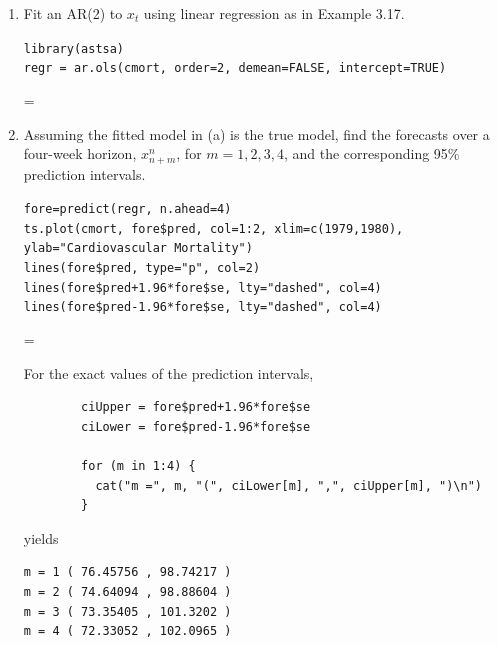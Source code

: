 \documentclass[12pt]{article}
\makeatletter
\newcommand*\notab[1]{%
  \begingroup   %
    \par        %
    \@totalleftmargin=0pt \linewidth=\columnwidth
    \parshape 0
    #1\par      %
  \endgroup
}
\newcommand{\nl}{\vspace{0.1in}\noindent}
\makeatother
\begin{document}
\begin{enumerate}[label=(\alph*)]
    \item Fit an AR(2) to $x_t$ using linear regression as in Example 3.17.
    
    \noindent \soln 

    \noindent \texttt{library(astsa)}
    \\ \texttt{regr = ar.ols(cmort, order=2, demean=FALSE, intercept=TRUE)}

    \nl \notab{}
    \item Assuming the fitted model in (a) is the true model, find the forecasts over a four-week horizon, $x_{n+m}^n$, for $m = 1,2,3,4$, and the corresponding 95\% prediction intervals.
    
    \noindent \soln 

    \noindent \texttt{fore=predict(regr, n.ahead=4)}\\
    \texttt{ts.plot(cmort, fore\$pred, col=1:2, xlim=c(1979,1980), ylab="Cardiovascular Mortality")}\\
    \texttt{lines(fore\$pred, type="p", col=2)}\\
    \texttt{lines(fore\$pred+1.96*fore\$se, lty="dashed", col=4)}\\
    \texttt{lines(fore\$pred-1.96*fore\$se, lty="dashed", col=4)}\\

    \nl \notab{}

    \nl For the exact values of the prediction intervals,
    \begin{verbatim}
        ciUpper = fore$pred+1.96*fore$se
        ciLower = fore$pred-1.96*fore$se
        
        for (m in 1:4) {
          cat("m =", m, "(", ciLower[m], ",", ciUpper[m], ")\n")
        }\end{verbatim}

        yields \begin{verbatim}
m = 1 ( 76.45756 , 98.74217 )
m = 2 ( 74.64094 , 98.88604 )
m = 3 ( 73.35405 , 101.3202 )
m = 4 ( 72.33052 , 102.0965 )
        \end{verbatim}
\end{enumerate}
\vspace{0.5in}
\end{document}
